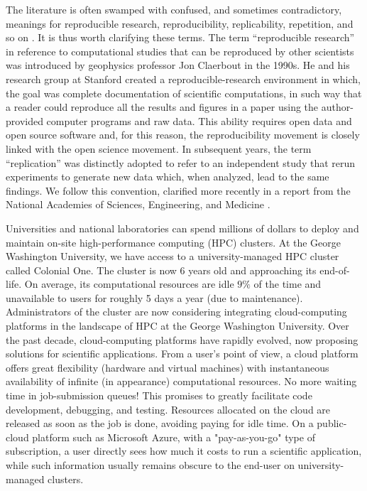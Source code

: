 \documentclass[10pt,journal,compsoc]{IEEEtran}
\begin{document}
The literature is often swamped with confused, and sometimes contradictory, meanings for reproducible research, reproducibility, replicability, repetition, and so on \cite{barba_2018}.
It is thus worth clarifying these terms.
The term ``reproducible research'' in reference to computational studies that can be reproduced by other scientists was introduced by geophysics professor Jon Claerbout in the 1990s. He and his research group at Stanford created a reproducible-research environment\cite{schwab_et_al_2000} in which, the goal was complete documentation of scientific computations, in such way that a reader could reproduce all the results and figures in a paper using the author-provided computer programs and raw data.
This ability requires open data and open source software and, for this reason, the reproducibility movement is closely linked with the open science movement.
In subsequent years, the term ``replication'' was distinctly adopted to refer to an independent study that rerun experiments to generate new data which, when analyzed, lead to the same findings.
We follow this convention, clarified more recently in a report from the National Academies of Sciences, Engineering, and Medicine \cite{nasa_oss_2018}.

Universities and national laboratories can spend millions of dollars to deploy and maintain on-site high-performance computing (HPC) clusters.
At the George Washington University, we have access to a university-managed HPC cluster called Colonial One.
The cluster is now $6$ years old and approaching its end-of-life.
On average, its computational resources are idle $9\%$ of the time and unavailable to users for roughly 5 days a year (due to maintenance).
Administrators of the cluster are now considering integrating cloud-computing platforms in the landscape of HPC at the George Washington University.
Over the past decade, cloud-computing platforms have rapidly evolved, now proposing solutions for scientific applications.
From a user's point of view, a cloud platform offers great flexibility (hardware and virtual machines) with instantaneous availability of infinite (in appearance) computational resources.
No more waiting time in job-submission queues!
This promises to greatly facilitate code development, debugging, and testing. Resources allocated on the cloud are released as soon as the job is done, avoiding paying for idle time.
On a public-cloud platform such as Microsoft Azure, with a "pay-as-you-go" type of subscription, a user directly sees how much it costs to run a scientific application, while such information usually remains obscure to the end-user on university-managed clusters.
\end{document}
